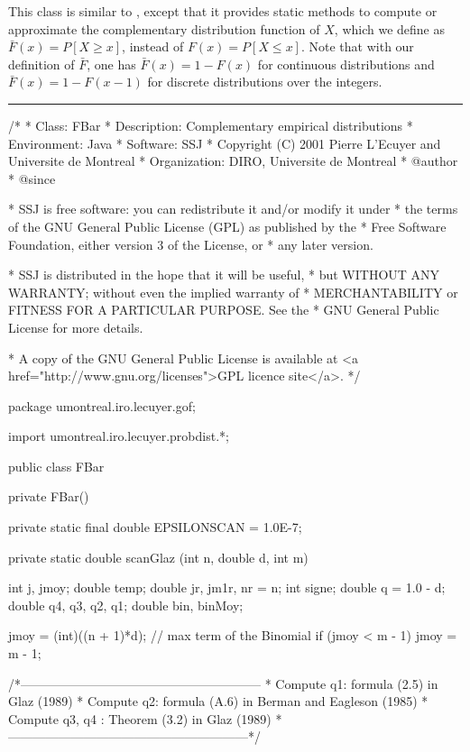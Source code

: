 
This class is similar to , except that it provides static methods
to compute or approximate the complementary distribution function of $X$,
which we define as $\bar F (x) = P[X\ge x]$, instead of $F (x)=P[X\le x]$.
Note that with our definition of $\bar F$, one has
$\bar F (x) = 1 - F (x)$ for continuous distributions and
$\bar F (x) = 1 - F (x-1)$ for discrete distributions over the integers.

\bigskip\hrule

\begin{code}
\begin{hide}
/*
 * Class:        FBar
 * Description:  Complementary empirical distributions
 * Environment:  Java
 * Software:     SSJ 
 * Copyright (C) 2001  Pierre L'Ecuyer and Universite de Montreal
 * Organization: DIRO, Universite de Montreal
 * @author       
 * @since

 * SSJ is free software: you can redistribute it and/or modify it under
 * the terms of the GNU General Public License (GPL) as published by the
 * Free Software Foundation, either version 3 of the License, or
 * any later version.

 * SSJ is distributed in the hope that it will be useful,
 * but WITHOUT ANY WARRANTY; without even the implied warranty of
 * MERCHANTABILITY or FITNESS FOR A PARTICULAR PURPOSE.  See the
 * GNU General Public License for more details.

 * A copy of the GNU General Public License is available at
   <a href="http://www.gnu.org/licenses">GPL licence site</a>.
 */
\end{hide}
package umontreal.iro.lecuyer.gof;
\begin{hide}
import umontreal.iro.lecuyer.probdist.*;
\end{hide}

public class FBar\begin{hide} {
   private FBar() {}

   private static final double EPSILONSCAN = 1.0E-7;

   private static double scanGlaz (int n, double d, int m) {
      int j, jmoy;
      double temp;
      double jr, jm1r, nr = n;
      int signe;
      double q = 1.0 - d;
      double q4, q3, q2, q1;
      double bin, binMoy;

      jmoy = (int)((n + 1)*d);              // max term of the Binomial
      if (jmoy < m - 1)
         jmoy = m - 1;

      /*---------------------------------------------------------
       * Compute q1: formula (2.5) in Glaz (1989)
       * Compute q2: formula (A.6) in Berman and Eagleson (1985)
       * Compute q3, q4 : Theorem (3.2) in Glaz (1989)
       *---------------------------------------------------------*/

}}
\end{hide}
\end{code}
